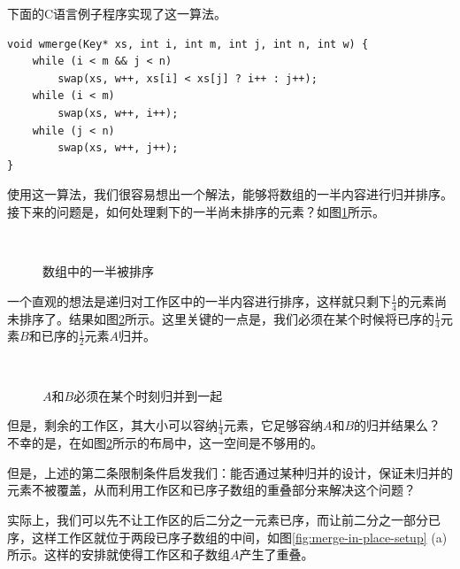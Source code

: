 \documentclass[b5paper]{ctexart}
\begin{document}
下面的C语言例子程序实现了这一算法。

\lstset{language=C}
\begin{lstlisting}
void wmerge(Key* xs, int i, int m, int j, int n, int w) {
    while (i < m && j < n)
        swap(xs, w++, xs[i] < xs[j] ? i++ : j++);
    while (i < m)
        swap(xs, w++, i++);
    while (j < n)
        swap(xs, w++, j++);
}
\end{lstlisting}

使用这一算法，我们很容易想出一个解法，能够将数组的一半内容进行归并排序。接下来的问题是，如何处理剩下的一半尚未排序的元素？如图\ref{fig:merge-in-place-start}所示。

\begin{figure}[htbp]
 \centering
       \\
 \caption{数组中的一半被排序}
 \label{fig:merge-in-place-start}
\end{figure}

一个直观的想法是递归对工作区中的一半内容进行排序，这样就只剩下$\frac{1}{4}$的元素尚未排序了。结果如图\ref{fig:merge-in-place-quater}所示。这里关键的一点是，我们必须在某个时候将已序的$\frac{1}{4}$元素$B$和已序的$\frac{1}{2}$元素$A$归并。

\begin{figure}[htbp]
 \centering
       \\
 \caption{$A$和$B$必须在某个时刻归并到一起}
 \label{fig:merge-in-place-quater}
\end{figure}

但是，剩余的工作区，其大小可以容纳$\frac{1}{4}$元素，它足够容纳$A$和$B$的归并结果么？不幸的是，在如图\ref{fig:merge-in-place-quater}所示的布局中，这一空间是不够用的。

但是，上述的第二条限制条件启发我们：能否通过某种归并的设计，保证未归并的元素不被覆盖，从而利用工作区和已序子数组的重叠部分来解决这个问题？

实际上，我们可以先不让工作区的后二分之一元素已序，而让前二分之一部分已序，这样工作区就位于两段已序子数组的中间，如图\ref{fig:merge-in-place-setup} (a)所示。这样的安排就使得工作区和子数组$A$产生了重叠\cite{msort-in-place}。
\end{document}
